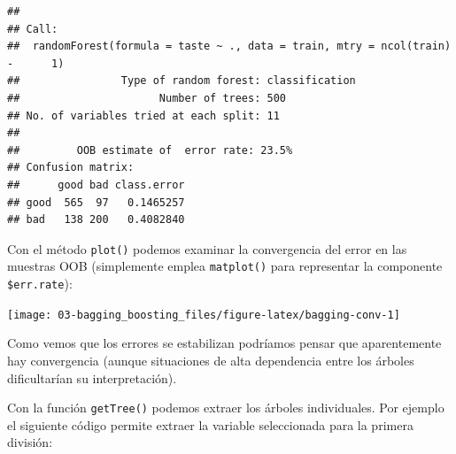 \documentclass[
  spanish,
]{book}
\newenvironment{Shaded}{\begin{snugshade}}{\end{snugshade}}
\newcommand{\AttributeTok}[1]{\textcolor[rgb]{0.77,0.63,0.00}{#1}}
\newcommand{\CommentTok}[1]{\textcolor[rgb]{0.56,0.35,0.01}{\textit{#1}}}
\newcommand{\ConstantTok}[1]{\textcolor[rgb]{0.00,0.00,0.00}{#1}}
\newcommand{\ControlFlowTok}[1]{\textcolor[rgb]{0.13,0.29,0.53}{\textbf{#1}}}
\newcommand{\DecValTok}[1]{\textcolor[rgb]{0.00,0.00,0.81}{#1}}
\newcommand{\FunctionTok}[1]{\textcolor[rgb]{0.00,0.00,0.00}{#1}}
\newcommand{\NormalTok}[1]{#1}
\newcommand{\OtherTok}[1]{\textcolor[rgb]{0.56,0.35,0.01}{#1}}
\newcommand{\SpecialCharTok}[1]{\textcolor[rgb]{0.00,0.00,0.00}{#1}}
\newcommand{\StringTok}[1]{\textcolor[rgb]{0.31,0.60,0.02}{#1}}
\theoremstyle{break}
\theoremstyle{definition}
\theoremstyle{definition}
\theoremstyle{definition}
\theoremstyle{definition}
\theoremstyle{remark}
\begin{document}
\begin{verbatim}
## 
## Call:
##  randomForest(formula = taste ~ ., data = train, mtry = ncol(train) -      1) 
##                Type of random forest: classification
##                      Number of trees: 500
## No. of variables tried at each split: 11
## 
##         OOB estimate of  error rate: 23.5%
## Confusion matrix:
##      good bad class.error
## good  565  97   0.1465257
## bad   138 200   0.4082840
\end{verbatim}

Con el método \texttt{plot()} podemos examinar la convergencia del error en las muestras OOB (simplemente emplea \texttt{matplot()} para representar la componente \texttt{\$err.rate}):

\begin{Shaded}
\end{Shaded}

\begin{center}\texttt{[image: 03-bagging\_boosting\_files/figure-latex/bagging-conv-1]} \end{center}

Como vemos que los errores se estabilizan podríamos pensar que aparentemente hay convergencia (aunque situaciones de alta dependencia entre los árboles dificultarían su interpretación).

Con la función \texttt{getTree()} podemos extraer los árboles individuales.
Por ejemplo el siguiente código permite extraer la variable seleccionada para la primera división:

\begin{Shaded}
\end{Shaded}
\end{document}
